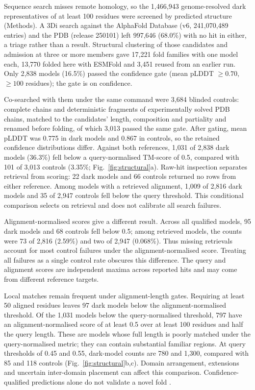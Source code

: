 \documentclass[11pt]{article}
\begin{document}
Sequence search misses remote homology, so the 1{,}466{,}943 genome-resolved dark representatives
of at least 100 residues were screened by predicted structure (Methods). A 3Di search against the
AlphaFold Database (v6, 241{,}070{,}489 entries) and the PDB (release 250101) left 997{,}646
(68.0\%) with no hit in either, a triage rather than a result. Structural clustering of those
candidates and admission at three or more members gave 17{,}221 fold families with one model each,
13{,}770 folded here with ESMFold and 3{,}451 reused from an earlier run. Only 2{,}838 models
(16.5\%) passed the confidence gate (mean pLDDT $\geq 0.70$, $\geq 100$ residues); the gate is on
confidence.

Co-searched with them under the same command were 3{,}684 blinded controls: complete chains and
deterministic fragments of experimentally solved PDB chains, matched to the candidates' length,
composition and partiality and renamed before folding, of which 3{,}013 passed the same gate. After gating, mean pLDDT was 0.775 in dark models and 0.867 in controls, so the retained confidence distributions differ.
Against both references, 1{,}031 of 2{,}838 dark models (36.3\%) fell below a query-normalised
TM-score of 0.5, compared with 101 of 3{,}013 controls (3.35\%; Fig.~\ref{fig:structural}a).
Raw-hit inspection separates retrieval from scoring: 22 dark models and 66 controls returned
no rows from either reference. Among models with a retrieved alignment, 1{,}009 of 2{,}816 dark
models and 35 of 2{,}947 controls fell below the query threshold. This conditional comparison
selects on retrieval and does not calibrate all search failures.

Alignment-normalised scores give a different result. Across all qualified models, 95 dark
models and 68 controls fell below 0.5; among retrieved models, the counts were 73 of 2{,}816
(2.59\%) and two of 2{,}947 (0.068\%). Thus missing retrievals account for most control failures
under the alignment-normalised score. Treating all failures as a single control rate obscures
this difference. The query and alignment scores are independent maxima across reported hits
and may come from different reference targets.

Local matches remain frequent under alignment-length gates. Requiring at least 50 aligned
residues leaves 97 dark models below the alignment-normalised threshold. Of the 1{,}031 models
below the query-normalised threshold, 797 have an alignment-normalised score of at least 0.5
over at least 100 residues and half the query length. These are models whose full length is
poorly matched under the query-normalised metric; they can contain substantial familiar regions.
At query thresholds of 0.45 and 0.55, dark-model counts are 780 and 1{,}300, compared with 85
and 118 controls (Fig.~\ref{fig:structural}b,c). Domain arrangement, extensions and uncertain
inter-domain placement can affect this comparison. Confidence-qualified predictions alone do
not validate a novel fold \citep{orr2026spurious}.
\end{document}
